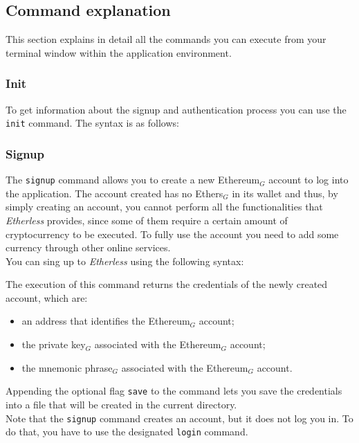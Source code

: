\subsection{Command explanation}\label{commands}
This section explains in detail all the commands you can execute from your terminal window within the application environment.

\subsubsection{Init}
To get information about the signup and authentication process you can use the \texttt{init} command. The syntax is as follows:
\begin{center}
\end{center}

\subsubsection{Signup}
The \texttt{signup} command allows you to create a new Ethereum$_{G}$ account to log into the application. The account created has no Ethers$_{G}$ in its wallet and thus, by simply creating an account, you cannot perform all the functionalities that \textit{Etherless} provides, since some of them require a certain amount of cryptocurrency to be executed.
To fully use the account you need to add some currency through other online services. \\
You can sing up to \textit{Etherless} using the following syntax:

\begin{center}
\end{center}

\noindent The execution of this command returns the credentials of the newly created account, which are:
\begin{itemize}
	\item an address that identifies the Ethereum$_{G}$ account;
	\item the private key$_{G}$ associated with the Ethereum$_{G}$ account;
	\item the mnemonic phrase$_{G}$ associated with the Ethereum$_{G}$ account.
\end{itemize}
Appending the optional flag \texttt{save} to the command lets you save the credentials into a file that will be created in the current directory. \\
Note that the \texttt{signup} command creates an account, but it does not log you in. To do that, you have to use the designated \texttt{login} command.

